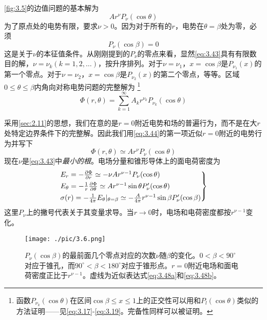 \documentclass[12pt]{book}
\numberwithin{equation}{chapter}
\numberwithin{figure}{chapter}
\numberwithin{footnote}{page}
\begin{document}
\autoref{fig:3.5}的边值问题的基本解为
$$A r^\nu P_\nu(\cos\theta)$$
为了原点处的电势有限，要求$\nu>0$。因为对于所有的$r$，电势在$\theta=\beta$处为零，必须
\begin{equation}\label{eq:3.43}
    P_\nu(\cos\beta)=0
\end{equation}
这是关于$\nu$的本征值条件。从刚刚提到的$P_\nu$的零点来看，显然\autoref{eq:3.43}具有有限数目的解，$\nu=\nu_k(k=1,2,\dots)$，按升序排列。对于$\nu=\nu_1$，$x=\cos\beta$是$P_{\nu_1}(x)$的第一个零点。对于$\nu=\nu_2$，$x=\cos\beta$是$P_{\nu_2}(x)$的第二个零点，等等。区域$0\leq\theta\le\beta$内角向对称电势问题的完整解为
\footnote{函数$P_{\nu_k}(\cos\theta)$在区间$\cos\beta\leq x\leq1$上的正交性可以用和$P_l(\cos\theta)$类似的方法证明——见\autoref{eq:3.17}-\autoref{eq:3.19}。完备性同样可以被证明。}
\begin{equation}\label{eq:3.44}
    \Phi(r,\theta)=\sum_{k=1}^\infty A_k r^{\nu_k}P_{\nu_k}(\cos\theta)
\end{equation}

采用\autoref{sec:2.11}的思想，我们在意的是$r=0$附近电势和场的普遍行为，而不是在大$r$处特定边界条件下的完整解。因此我们用\autoref{eq:3.44}的第一项近似$r=0$附近的电势行为并写下
\begin{equation}\label{eq:3.45}
    \Phi(r,\theta)\simeq Ar^{\nu}P_\nu(\cos\theta)
\end{equation}
现在$\nu$是\autoref{eq:3.43}中\textit{最小的根}。电场分量和锥形导体上的面电荷密度为
\begin{equation}\label{eq:3.46}
    \begin{rcases*}
        E_r=-\frac{\partial \Phi}{\partial r}\simeq - \nu A r^{\nu-1}P_\nu(\cos\theta)\\
        E_\theta=-\frac{1}{r}\frac{\partial \Phi}{\partial \theta}\simeq Ar^{\nu-1}\sin\theta P'_\nu(\cos\theta)\\
        \sigma(r)=-\frac{1}{4\pi}E_\theta|_{\theta=\beta}\simeq -\frac{A}{4\pi}r^{\nu-1}\sin\beta P'_\nu(\cos\beta)\\
    \end{rcases*}
\end{equation}
这里$P_\nu$上的撇号代表关于其变量求导。当$r\to 0$时，电场和电荷密度都按$r^{\nu-1}$变化。

\begin{figure}[!ht]
    \centering
    \texttt{[image: ./pic/3.6.png]}
    \captionsetup{justification=raggedright, singlelinecheck=false}
    \caption{$P_\nu(\cos\beta)$的最前面几个零点对应的次数$\nu$随$\beta$的变化。$0<\beta<90^\circ$对应于锥孔，而$90^\circ<\beta<180^\circ$对应于锥形点。$r=0$附近电场和面电荷密度正比于$r^{\nu-1}$。虚线为近似表达式\autoref{eq:3.48a}和\autoref{eq:3.48b}。}
    \label{fig:3.6}
\end{figure}
\end{document}
